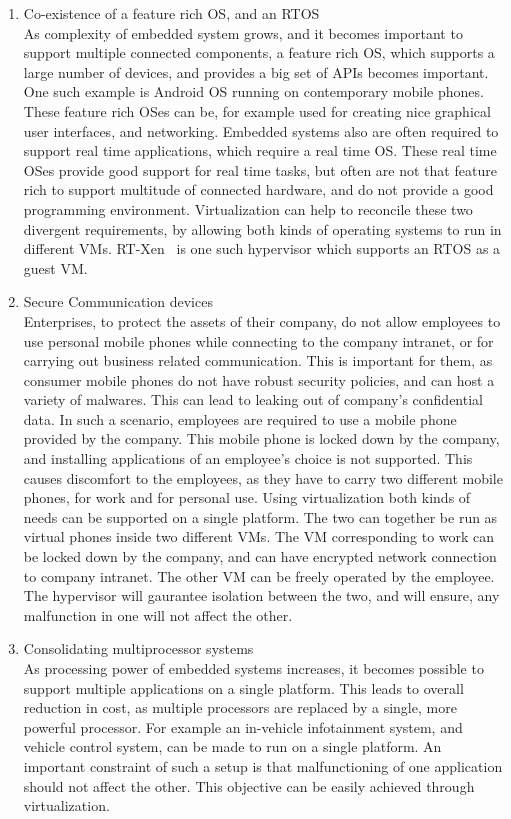 \documentclass[seminar,twoside]{iitbreport}
\begin{document}
\begin{enumerate}
 \item Co-existence of a feature rich OS, and an RTOS\\
 As complexity of embedded system grows, and it becomes important to support multiple connected components, a feature rich OS, which supports a large number of devices, and 
 provides a big set of APIs becomes important. One such example is Android OS running on contemporary mobile phones. These feature rich OSes can be, for example used for creating
  nice graphical user interfaces, and networking. 
 Embedded systems also are often required to support real time applications, which require a real time OS. These real time OSes provide good support for real time tasks, but often
  are not that feature rich to support multitude of connected hardware, and do not provide a good programming environment. Virtualization can help to reconcile these two divergent requirements, 
  by allowing both kinds of operating systems to run in different VMs. RT-Xen~\cite{6064510} is one such hypervisor which supports an RTOS as a guest VM.
  \item Secure Communication devices\\
  Enterprises, to protect the assets of their company, do not allow employees to use personal mobile phones while connecting to the company intranet, or for carrying out
  business related communication. This is important for them, as consumer mobile phones do not have robust security policies, and can host a variety of malwares. This can lead to
   leaking out of company's confidential data.
    In such a scenario, employees are required to use a mobile phone provided by the company. This mobile phone is locked down by the company, and installing applications of
     an employee's choice is not supported. This causes discomfort to the employees, as they have to carry two different mobile phones, for work and for personal use. 
     Using virtualization both kinds of needs can be supported on a single platform. The two can together be run as virtual phones inside two different VMs. The VM corresponding to
     work can be locked down by the company, and can have encrypted network connection to company intranet. The other VM can be freely operated by the employee.
     The hypervisor will gaurantee isolation between the two, and will ensure, any malfunction in one will not affect the other.
     \item Consolidating multiprocessor systems\\
     As processing power of embedded systems increases, it becomes possible to support multiple applications on a single platform. This leads to overall reduction in cost, as multiple 
     processors are replaced by a single, more powerful processor. For example an in-vehicle infotainment system, and 
     vehicle control system, can be made to run on a single platform. An important constraint of such a setup is that malfunctioning of one application should not 
     affect the other. This objective can be easily achieved through virtualization.
\end{enumerate}
\end{document}
